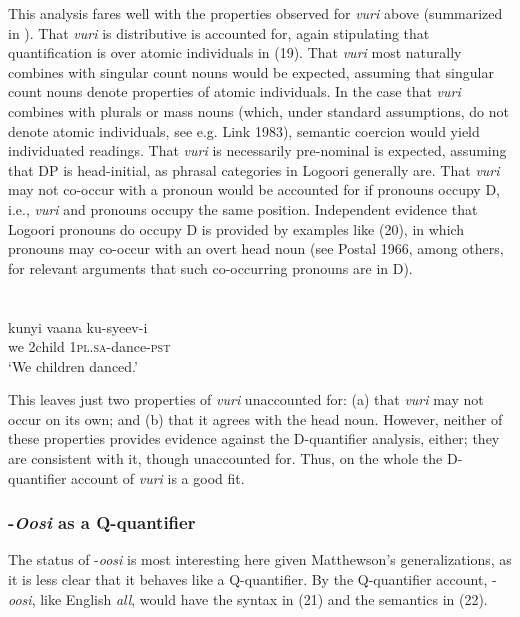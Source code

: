\documentclass[output=paper]{langsci/langscibook}
\begin{document}
This analysis fares well with the properties observed for \textit{vuri} above (summarized in ). That \textit{vuri} is distributive is accounted for, again stipulating that quantification is over atomic individuals in (19). That \textit{vuri} most naturally combines with singular count nouns would be expected, assuming that singular count nouns denote properties of atomic individuals. In the case that \textit{vuri }combines with plurals or mass nouns (which, under standard assumptions, do not denote atomic individuals, see e.g. Link 1983), semantic coercion would yield individuated readings. That \textit{vuri} is necessarily pre-nominal is expected, assuming that DP is head-initial, as phrasal categories in Logoori generally are. That \textit{vuri} may not co-occur with a pronoun would be accounted for if pronouns occupy D, i.e., \textit{vuri }and pronouns occupy the same position. Independent evidence that Logoori pronouns do occupy D is provided by examples like (20), in which pronouns may co-occur with an overt head noun (see Postal 1966, among others, for relevant arguments that such co-occurring pronouns are in D).

\chapter[  ]{  }
\gll kunyi  vaana    ku-syeev-i\\
     we  2child    1\textsc{pl}.\textsc{sa}{}-dance-\textsc{pst  }\\
\glt ‘We children danced.’
\z

  This leaves just two properties of \textit{vuri }unaccounted for: (a) that \textit{vuri} may not occur on its own; and (b) that it agrees with the head noun. However, neither of these properties provides evidence against the D-quantifier analysis, either; they are consistent with it, though unaccounted for. Thus, on the whole the D-quantifier account of \textit{vuri} is a good fit.

\subsection{{}-\textit{Oosi} as a Q-quantifier}

The status of -\textit{oosi} is most interesting here given Matthewson's generalizations, as it is less clear that\textit{ }it behaves like a Q-quantifier. By the Q-quantifier account, -\textit{oosi}, like English \textit{all}, would have the syntax in (21) and the semantics in (22).
\end{document}
